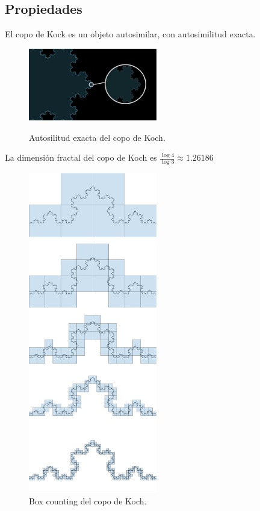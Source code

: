 \subsection{Propiedades}

\noindent El copo de Kock es un objeto autosimilar, con autosimilitud exacta.

\begin{figure}[H]
\centering
\includegraphics[width=0.5\textwidth]{figures/kock-snowflake-self-similarity.jpg}
\caption{Autosilitud exacta del copo de Koch.}
\label{fig:koch-snowflake-self-similarity}
\cite{youtube-2022}
\end{figure}

\noindent La dimensión fractal del copo de Koch es $\frac{\log 4}{\log 3} \approx 1.26186$\\

\begin{figure}[H]
    \centering
    \includegraphics[width=0.5\textwidth]{figures/box-counting-koch-snowflake.png}
    \caption{Box counting del copo de Koch.}
    \label{fig:box-counting-koch-snowflake}
\end{figure}

